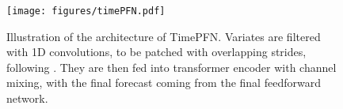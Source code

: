\begin{figure}[t!] 
   \centering    \texttt{[image: figures/timePFN.pdf]}
   \caption{Illustration of the architecture of TimePFN. Variates are filtered with 1D convolutions, to be patched with overlapping strides, following \cite{Yuqietal-2023-PatchTST}. They are then fed into transformer encoder with channel mixing, with the final forecast coming from the final feedforward network.}
\end{figure}